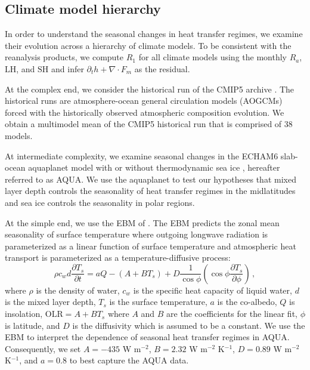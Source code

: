 \documentclass{ametsocV5}
\begin{document}
    
    \subsection{Climate model hierarchy}\label{subsubsec:models}
    In order to understand the seasonal changes in heat transfer regimes, we examine their evolution across a hierarchy of climate models. To be consistent with the reanalysis products, we compute $R_1$ for all climate models using the monthly $R_a$, $\mathrm{LH}$, and $\mathrm{SH}$ and infer $\partial_t h + \nabla\cdot F_m $ as the residual.
    
    At the complex end, we consider the historical run of the CMIP5 archive \citep{taylor2012}. The historical runs are atmosphere-ocean general circulation models (AOGCMs) forced with the historically observed atmospheric composition evolution. We obtain a multimodel mean of the CMIP5 historical run that is comprised of 38 models.
    
    At intermediate complexity, we examine seasonal changes in the ECHAM6 slab-ocean aquaplanet model \citep{stevens2013} with or without thermodynamic sea ice \citep{shaw2020}, hereafter referred to as AQUA. We use the aquaplanet to test our hypotheses that mixed layer depth controls the seasonality of heat transfer regimes in the midlatitudes and sea ice controls the seasonality in polar regions.

    At the simple end, we use the EBM of \cite{rose2017}. The EBM predicts the zonal mean seasonality of surface temperature where outgoing longwave radiation is parameterized as a linear function of surface temperature and atmospheric heat transport is parameterized as a temperature-diffusive process:
    \begin{equation}
      \rho c_w d \frac{\partial T_s}{\partial t} = aQ - (A+BT_s)  + D \frac{1}{\cos\phi}\left( \cos\phi \frac{\partial T_s}{\partial \phi} \right)\, ,
    \end{equation}
    where $\rho$ is the density of water, $c_w$ is the specific heat capacity of liquid water, $d$ is the mixed layer depth, $T_s$ is the surface temperature, $a$ is the co-albedo, $Q$ is insolation, $\mathrm{OLR}=A+BT_s$ where $A$ and $B$ are the coefficients for the linear fit, $\phi$ is latitude, and $D$ is the diffusivity which is assumed to be a constant. We use the EBM to interpret the dependence of seasonal heat transfer regimes in AQUA. Consequently, we set $A=-435$ W m$^{-2}$, $B=2.32$ W m$^{-2}$ K$^{-1}$, $D=0.89$ W m$^{-2}$ K$^{-1}$, and $a=0.8$ to best capture the AQUA data.
\end{document}
